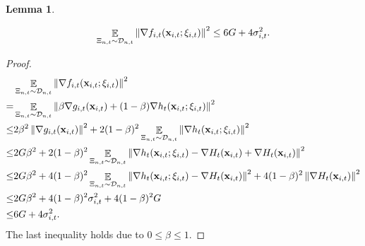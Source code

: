 \documentclass{article}
\newtheorem{Lemma}{\bf{Lemma}}
\begin{document}
\begin{Lemma}
\label{lemma_stochastic_gradient_norm_bound}

\begin{align}
\nonumber
\mathop{\mathbb{E}}_{ \Xi_{n,t} \sim \mathcal{D}_{n,t} }\left\lVert \nabla f_{i,t}({\bf x}_{i,t};\xi_{i,t})\right\rVert^2 \le 6G  + 4 \sigma_{i,t}^2.
\end{align}


\end{Lemma}
\begin{proof}

\begin{align}
\nonumber
& \mathop{\mathbb{E}}_{ \Xi_{n,t} \sim \mathcal{D}_{n,t} }\left\lVert \nabla f_{i,t}({\bf x}_{i,t};\xi_{i,t})\right\rVert^2 \\ \nonumber 
= & \mathop{\mathbb{E}}_{ \Xi_{n,t} \sim \mathcal{D}_{n,t} }\left\lVert \beta \nabla g_{i,t}({\bf x}_{i,t}) + (1-\beta)\nabla h_t({\bf x}_{i,t};\xi_{i,t})\right\rVert^2 \\ \nonumber 
\le &  2\beta^2 \left\lVert \nabla g_{i,t}({\bf x}_{i,t}) \right\rVert^2 + 2(1-\beta)^2 \mathop{\mathbb{E}}_{ \Xi_{n,t} \sim \mathcal{D}_{n,t} } \left\lVert \nabla h_t({\bf x}_{i,t};\xi_{i,t}) \right\rVert^2 \\ \nonumber 
\le & 2G\beta^2  + 2(1-\beta)^2 \mathop{\mathbb{E}}_{ \Xi_{n,t} \sim \mathcal{D}_{n,t} } \left\lVert \nabla h_t({\bf x}_{i,t};\xi_{i,t}) - \nabla H_t({\bf x}_{i,t}) + \nabla H_t({\bf x}_{i,t})\right\rVert^2 \\ \nonumber 
\le & 2G\beta^2  +  4(1-\beta)^2 \mathop{\mathbb{E}}_{ \Xi_{n,t} \sim \mathcal{D}_{n,t} } \left\lVert \nabla h_t({\bf x}_{i,t};\xi_{i,t}) - \nabla H_t({\bf x}_{i,t}) \right\rVert^2 +  4(1-\beta)^2 \left\lVert \nabla H_t({\bf x}_{i,t})\right\rVert^2 \\ \nonumber 
\le & 2G\beta^2  + 4(1-\beta)^2 \sigma_{i,t}^2 + 4(1-\beta)^2 G \\ \nonumber 
\le & 6G  + 4 \sigma_{i,t}^2.
\end{align} The last inequality holds due to $0\le \beta \le 1$.



\end{proof}
\end{document}
